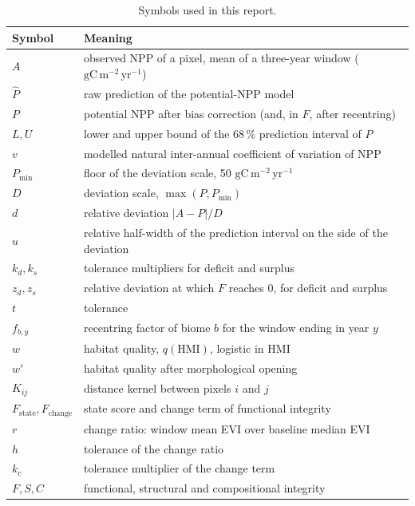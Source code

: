 \documentclass[11pt,a4paper]{article}
\newcommand{\npp}{\ensuremath{\mathrm{gC\,m^{-2}\,yr^{-1}}}}
\newcommand{\HMI}{\mathrm{HMI}}
\begin{document}
\begin{table}[H]
\centering\small
\caption{Symbols used in this report.}
\begin{tabularx}{\textwidth}{lL}
\toprule
Symbol & Meaning \\
\midrule
$A$ & observed NPP of a pixel, mean of a three-year window (\npp) \\
$\hat P$ & raw prediction of the potential-NPP model \\
$P$ & potential NPP after bias correction (and, in $F$, after recentring) \\
$L, U$ & lower and upper bound of the 68\,\% prediction interval of $P$ \\
$v$ & modelled natural inter-annual coefficient of variation of NPP \\
$P_{\min}$ & floor of the deviation scale, 50 \npp \\
$D$ & deviation scale, $\max(P, P_{\min})$ \\
$d$ & relative deviation $|A-P|/D$ \\
$u$ & relative half-width of the prediction interval on the side of the deviation \\
$k_d, k_s$ & tolerance multipliers for deficit and surplus \\
$z_d, z_s$ & relative deviation at which $F$ reaches 0, for deficit and surplus \\
$t$ & tolerance \\
$f_{b,y}$ & recentring factor of biome $b$ for the window ending in year $y$ \\
$w$ & habitat quality, $q(\HMI)$, logistic in HMI \\
$w'$ & habitat quality after morphological opening \\
$K_{ij}$ & distance kernel between pixels $i$ and $j$ \\
$F_{\text{state}}, F_{\text{change}}$ & state score and change term of functional integrity \\
$r$ & change ratio: window mean EVI over baseline median EVI \\
$h$ & tolerance of the change ratio \\
$k_c$ & tolerance multiplier of the change term \\
$F, S, C$ & functional, structural and compositional integrity \\
\bottomrule
\end{tabularx}
\end{table}

\end{document}
